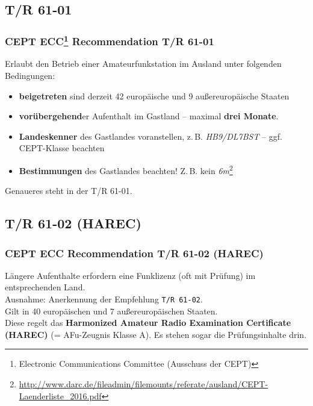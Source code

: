 \subsection{T/R 61-01}

\begin{frame}
  \frametitle{CEPT ECC\footnote{Electronic Communications Committee (Ausschuss
  der CEPT)} Recommendation T/R 61-01}

  Erlaubt den Betrieb einer Amateurfunkstation im Ausland unter folgenden
  Bedingungen:

  \begin{itemize}
    \item \textbf{beigetreten} sind derzeit 42 europäische und 9
      außereuropäische Staaten
    \item \textbf{vorübergehend}er Aufenthalt im Gastland -- maximal
      \textbf{drei Monate}.
    \item \textbf{Landeskenner} des Gastlandes voranstellen, z.\,B.
      \emph{HB9/DL7BST} -- ggf. CEPT-Klasse beachten
    \item \textbf{Bestimmungen} des Gastlandes beachten! Z.\,B. kein
      \emph{6m}\footnote{\scriptsize\ExternalLink\url{http://www.darc.de/fileadmin/filemounts/referate/ausland/CEPT-Laenderliste_2016.pdf}}
  \end{itemize}

  Genaueres steht in der T/R 61-01.

\end{frame}

\subsection{T/R 61-02 (HAREC)}

\begin{frame}
  \frametitle{CEPT ECC Recommendation T/R 61-02 (HAREC)}

  Längere Aufenthalte erfordern eine Funklizenz (oft mit Prüfung) im
  entsprechenden Land. \\[1em]

  Ausnahme: Anerkennung der Empfehlung \texttt{T/R 61-02}. \\[1em]

  Gilt in 40 europäischen und 7 außereuropäischen Staaten. \\[1em]

  Diese regelt das \textbf{Harmonized Amateur Radio Examination Certificate
  (HAREC)} (= AFu-Zeugnis Klasse A). Es stehen sogar die Prüfungsinhalte drin.

\end{frame}

